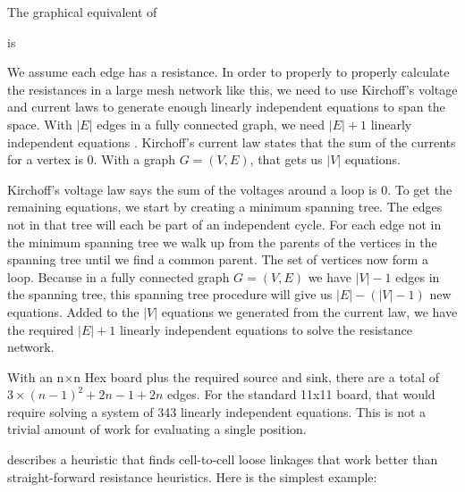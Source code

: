 \documentclass[12pt,titlepage]{amsart}
\begin{document}
The graphical equivalent of

\begin{HexBoard}[board size=5]
\end{HexBoard}

is


We assume each edge has a resistance. In order to properly to properly calculate
the resistances in a large mesh network like this, we need to use Kirchoff's
voltage and current laws to generate enough linearly independent equations to
span the space. With $|E|$ edges in a fully connected graph, we need $|E|+1$
linearly independent equations \cite{Moody2013}. Kirchoff's current law states
that the sum of the currents for a vertex is 0. With a graph $G=(V,E)$, that
gets us $|V|$ equations.

Kirchoff's voltage law says the sum of the voltages around a loop is 0. To get
the remaining equations, we start by creating a minimum spanning tree. The edges
not in that tree will each be part of an independent cycle. For each edge not in
the minimum spanning tree we walk up from the parents of the vertices in the
spanning tree until we find a common parent. The set of vertices now form a
loop. Because in a fully connected graph $G=(V,E)$ we have $|V|-1$ edges in the
spanning tree, this spanning tree procedure will give us $|E|-(|V|-1)$ new
equations. Added to the $|V|$ equations we generated from the current law, we
have the required $|E|+1$ linearly independent equations to solve the resistance
network.

With an n$\times$n Hex board plus the required source and sink, there
are a total of $3\times(n-1)^2+2n-1 + 2n$ edges. For the standard
11x11 board, that would require solving a system of 343 linearly
independent equations. This is not a trivial amount of work for
evaluating a single position.

\cite{ANSHELEVICH2002101} describes a heuristic that finds cell-to-cell loose
linkages that work better than straight-forward resistance heuristics. Here is
the simplest example:

\begin{HexBoard}[board size=5]
\end{HexBoard}
\end{document}
